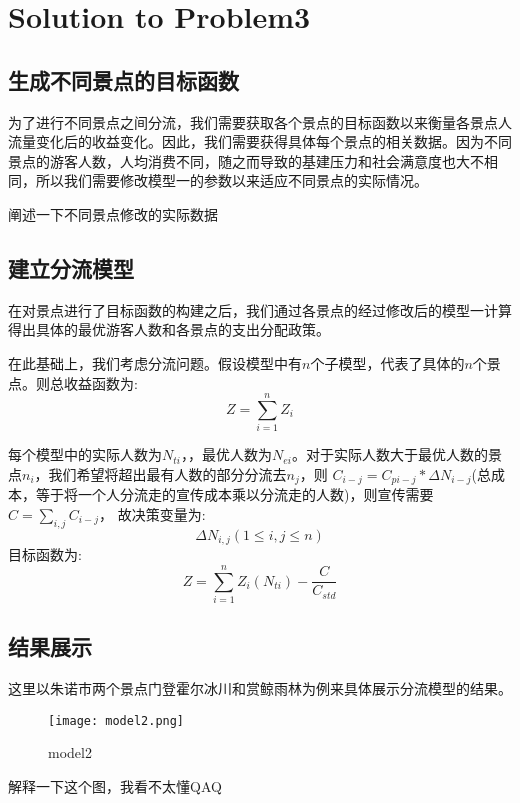 \documentclass[12pt]{article}  %
\begin{document}
\section{Solution to Problem3}
\subsection{生成不同景点的目标函数}
为了进行不同景点之间分流，我们需要获取各个景点的目标函数以来衡量各景点人流量变化后的收益变化。因此，我们需要获得具体每个景点的相关数据。因为不同景点的游客人数，人均消费不同，随之而导致的基建压力和社会满意度也大不相同，所以我们需要修改模型一的参数以来适应不同景点的实际情况。

阐述一下不同景点修改的实际数据
\subsection{建立分流模型}
在对景点进行了目标函数的构建之后，我们通过各景点的经过修改后的模型一计算得出具体的最优游客人数和各景点的支出分配政策。

在此基础上，我们考虑分流问题。假设模型中有$n$个子模型，代表了具体的$n$个景点。则总收益函数为:
\begin{equation}
    Z = \sum_{i=1}^{n} Z_i
\end{equation}

每个模型中的实际人数为$N_{ti}$，，最优人数为$N_{ei}$。对于实际人数大于最优人数的景点$n_i$，我们希望将超出最有人数的部分分流去$n_j$，则
$C_{i-j} = C_{pi-j}*\Delta N_{i-j}$(总成本，等于将一个人分流走的宣传成本乘以分流走的人数)，则宣传需要$C = \sum_{i,j} C_{i-j}$，
故决策变量为:
\begin{equation}
    \Delta N_{i,j} (1 \leq i,j \leq n)
\end{equation}
目标函数为:
\begin{equation}
	Z = \sum_{i=1}^{n} Z_i(N_{ti}) - \frac{C}{C_{std}}
\end{equation}
\subsection{结果展示}
这里以朱诺市两个景点门登霍尔冰川和赏鲸雨林为例来具体展示分流模型的结果。
\begin{figure}[H]
	\centering
	\texttt{[image: model2.png]}
	\caption{model2}\label{fig:model2}
\end{figure}
解释一下这个图，我看不太懂QAQ
\end{document}
